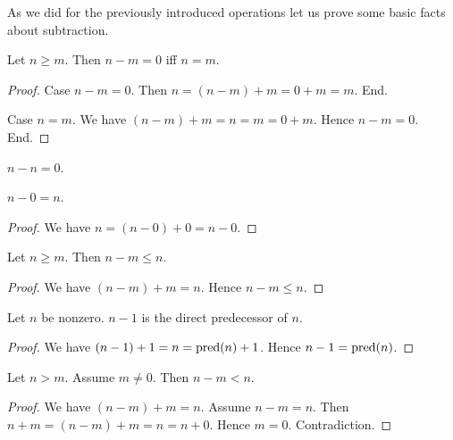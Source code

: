 \documentclass[../../arithmetic.ftl.tex]{subfiles}
\begin{document}
  As we did for the previously introduced operations let us prove some basic
  facts about subtraction.

  \begin{forthel}
    \begin{proposition}\label{Arithmetic_02_07_297505}
      Let $n \geq m$.
      Then $n - m = 0$ iff $n = m$.
    \end{proposition}
    \begin{proof}
      Case $n - m = 0$.
        Then $n = (n - m) + m = 0 + m = m$.
      End.

      Case $n = m$.
        We have $(n - m) + m = n = m = 0 + m$.
        Hence $n - m = 0$.
      End.
    \end{proof}

    \begin{corollary}\label{Arithmetic_02_07_239083}
      $n - n = 0$.
    \end{corollary}

    \begin{proposition}\label{Arithmetic_02_07_151829}
      $n - 0 = n$.
    \end{proposition}
    \begin{proof}
      We have $n = (n - 0) + 0 = n - 0$.
    \end{proof}

    \begin{proposition}\label{Arithmetic_02_07_236650}
      Let $n \geq m$.
      Then $n - m \leq n$.
    \end{proposition}
    \begin{proof}
      We have $(n - m) + m = n$.
      Hence $n - m \leq n$.
    \end{proof}

    \begin{proposition}\label{Arithmetic_02_07_554898}
      Let $n$ be nonzero.
      $n - 1$ is the direct predecessor of $n$.
    \end{proposition}
    \begin{proof}
      We have $(n - 1) + 1 = n = \operatorname{pred}(n) + 1$.
      Hence $n - 1 = \operatorname{pred}(n)$.
    \end{proof}

    \begin{proposition}\label{Arithmetic_02_07_654395}
      Let $n > m$.
      Assume $m \neq 0$.
      Then $n - m < n$.
    \end{proposition}
    \begin{proof}
      We have $(n - m) + m = n$.
      Assume $n - m = n$.
      Then $n + m = (n - m) + m = n = n + 0$.
      Hence $m = 0$.
      Contradiction.
    \end{proof}


\end{forthel}
\end{document}

